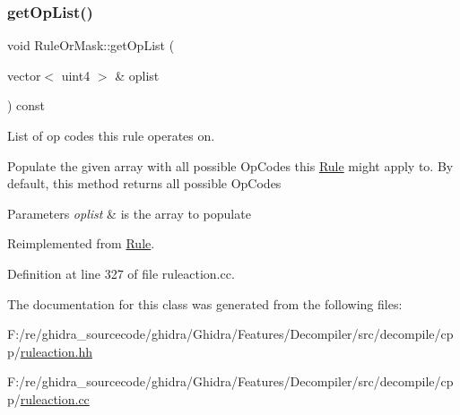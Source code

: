 \subsubsection{\texorpdfstring{getOpList()}{getOpList()}}
{\footnotesize\ttfamily void Rule\+Or\+Mask\+::get\+Op\+List (\begin{DoxyParamCaption}\item[{vector$<$ uint4 $>$ \&}]{oplist }\end{DoxyParamCaption}) const\hspace{0.3cm}{\ttfamily [virtual]}}



List of op codes this rule operates on. 

Populate the given array with all possible Op\+Codes this \mbox{\hyperlink{class_rule}{Rule}} might apply to. By default, this method returns all possible Op\+Codes 
\begin{DoxyParams}{Parameters}
{\em oplist} & is the array to populate \\
\hline
\end{DoxyParams}


Reimplemented from \mbox{\hyperlink{class_rule_a4023bfc7825de0ab866790551856d10e}{Rule}}.



Definition at line 327 of file ruleaction.\+cc.



The documentation for this class was generated from the following files\+:\begin{DoxyCompactItemize}
\item 
F\+:/re/ghidra\+\_\+sourcecode/ghidra/\+Ghidra/\+Features/\+Decompiler/src/decompile/cpp/\mbox{\hyperlink{ruleaction_8hh}{ruleaction.\+hh}}\item 
F\+:/re/ghidra\+\_\+sourcecode/ghidra/\+Ghidra/\+Features/\+Decompiler/src/decompile/cpp/\mbox{\hyperlink{ruleaction_8cc}{ruleaction.\+cc}}\end{DoxyCompactItemize}
